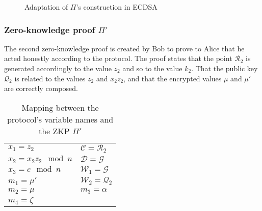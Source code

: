 \begin{figure}[h]
  \caption{Adaptation of $\Pi$'s construction in ECDSA}
  \label{fig:adaptationOfPi}
\end{figure}

\subsubsection{Zero-knowledge proof $\Pi'$}

The second zero-knowledge proof is created by Bob to prove to Alice that he
acted honestly according to the protocol. The proof states that the point
$\mathcal{R}_2$ is generated accordingly to the value $z_2$ and so to the value
$k_2$. That the public key $\mathcal{Q}_2$ is related to the values $z_2$ and
$x_2z_2$, and that the encrypted values $\mu$ and $\mu'$ are correctly composed.

\begin{table}[h]
  \begin{tabular}{p{4cm} l}
    $x_1 = z_2$ & $\mathcal{C} = \mathcal{R}_2$ \\
    $x_2 = x_2z_2 \mod n$ & $\mathcal{D} = \mathcal{G}$ \\
    $x_3 = c \mod n$ & $\mathcal{W}_1 = \mathcal{G}$ \\
    $m_1 = \mu'$ & $\mathcal{W}_2 = \mathcal{Q}_2$ \\
    $m_2 = \mu$ & $m_3 = \alpha$ \\
    $m_4 = \zeta$ &
  \end{tabular}
  \caption{Mapping between the protocol's variable names and the ZKP $\Pi'$}
  \label{fig:mappingOfVarNamesPi2}
\end{table}


